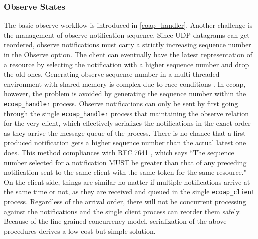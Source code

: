 \subsubsection{Observe States}

The basic observe workflow is introduced in \ref{coap_handler}. Another challenge is the management of observe notification sequence. Since UDP datagrams can get reordered, observe notifications must carry a strictly increasing sequence number in the Observe option. The client can eventually have the latest representation of a resource by selecting the notification with a higher sequence number and drop the old ones. Generating observe sequence number in a multi-threaded environment with shared memory is complex due to race conditions \cite{kovatsch2015scalable}. In ecoap, however, the problem is avoided by generating the sequence number within the \verb|ecoap_handler| process. Observe notifications can only be sent by first going through the single \verb|ecoap_handler| process that maintaining the observe relation for the very client, which effectively serializes the notifications in the exact order as they arrive the message queue of the process. There is no chance that a first produced notification gets a higher sequence number than the actual latest one does. This method compliances with RFC 7641 \cite{coap_observe}, which says ``The sequence number selected for a notification MUST be greater than that of any preceding notification sent to the same client with the same token for the same resource." On the client side, things are similar no matter if multiple notifications arrive at the same time or not, as they are received and queued in the single \verb|ecoap_client| process. Regardless of the arrival order, there will not be concurrent processing against the notifications and the single client process can reorder them safely. Because of the fine-grained concurrency model, serialization of the above procedures derives a low cost but simple solution. 





